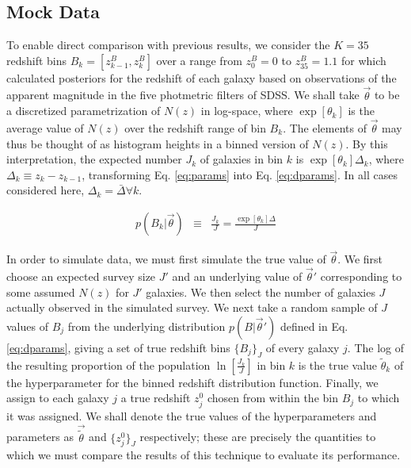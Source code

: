 \documentclass[preprint]{aastex}
\begin{document}
\subsection{Mock Data}
\label{sec:mock}

To enable direct comparison with previous results, we consider the $K=35$ redshift bins $B_{k}=[z^{B}_{k-1},z^{B}_{k}]$ over a range from $z^{B}_{0}=0$ to $z^{B}_{35}=1.1$ for which \citet{she11} calculated posteriors for the redshift of each galaxy based on observations of the apparent magnitude in the five photmetric filters of SDSS.  We shall take $\vec{\theta}$ to be a discretized parametrization of $N(z)$ in log-space, where $\exp[\theta_{k}]$ is the average value of $N(z)$ over the redshift range of bin $B_{k}$.   The elements of $\vec{\theta}$ may thus be thought of as histogram heights in a binned version of $N(z)$.  By this interpretation, the expected number $J_{k}$ of galaxies in bin $k$ is $\exp[\theta_{k}]\Delta_{k}$, where $\Delta_{k}\equiv z_{k}-z_{k-1}$, transforming Eq. \ref{eq:params} into Eq. \ref{eq:dparams}.  In all cases considered here, $\Delta_{k}=\bar{\Delta}\forall k$.

\begin{eqnarray}
\label{eq:dparams}
p(B_{k}|\vec{\theta}) &\equiv& \frac{J_{k}}{J} = \frac{\exp[\theta_{k}]\Delta}{J}
\end{eqnarray}

In order to simulate data, we must first simulate the true value of $\vec{\theta}$.  We first choose an expected survey size $J'$ and an underlying value of $\vec{\theta}'$ corresponding to some assumed $N(z)$ for $J'$ galaxies.  We then select the number of galaxies $J$ actually observed in the simulated survey.  We next take a random sample of $J$ values of $B_{j}$ from the underlying distribution $p(B|\vec{\theta}')$ defined in Eq. \ref{eq:dparams}, giving a set of true redshift bins $\{B_{j}\}_{J}$ of every galaxy $j$.  The log of the resulting proportion of the population $\ln[\frac{J_{k}}{J}]$ in bin $k$ is the true value $\tilde{\theta}_{k}$ of the hyperparameter for the binned redshift distribution function.  Finally, we assign to each galaxy $j$ a true redshift $z_{j}^{0}$ chosen from within the bin $B_{j}$ to which it was assigned.  We shall denote the true values of the hyperparameters and parameters as $\vec{\tilde{\theta}}$ and $\{z_{j}^{0}\}_{J}$ respectively; these are precisely the quantities to which we must compare the results of this technique to evaluate its performance.
\end{document}
